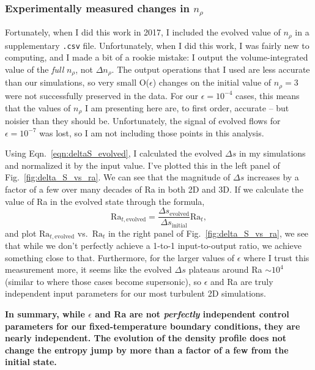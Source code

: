 \subsubsection{Experimentally measured changes in $n_\rho$}
Fortunately, when I did this work in 2017, I included the evolved value of $n_\rho$ in a supplementary \texttt{.csv} file.
Unfortunately, when I did this work, I was fairly new to computing, and I made a bit of a rookie mistake: I output the volume-integrated value of the \emph{full} $n_\rho$, not $\Delta n_\rho$.
The output operations that I used are less accurate than our simulations, so very small O($\epsilon$) changes on the initial value of $n_\rho = 3$ were not successfully preserved in the data.
For our $\epsilon = 10^{-4}$ cases, this means that the values of $n_\rho$ I am presenting here are, to first order, accurate -- but noisier than they should be.
Unfortunately, the signal of evolved flows for $\epsilon = 10^{-7}$ was lost, so I am not including those points in this analysis.

Using Eqn.~\ref{eqn:deltaS_evolved}, I calculated the evolved $\Delta s$ in my simulations and normalized it by the input value.
I've plotted this in the left panel of Fig.~\ref{fig:delta_S_vs_ra}.
We can see that the magnitude of $\Delta s$ increases by a factor of a few over many decades of Ra in both 2D and 3D.
If we calculate the value of Ra in the evolved state through the formula,
$$
\text{Ra}_{t, \text{evolved}} = \frac{\Delta s_{\text{evolved}}}{\Delta s_{\text{initial}}} \text{Ra}_{t},
$$
and plot $\text{Ra}_{t, \text{evolved}}$ vs.~$\text{Ra}_{t}$ in the right panel of Fig.~\ref{fig:delta_S_vs_ra}, we see that while we don't perfectly achieve a 1-to-1 input-to-output ratio, we achieve something close to that.
Furthermore, for the larger values of $\epsilon$ where I trust this measurement more, it seems like the evolved $\Delta s$ plateaus around Ra $\sim 10^4$ (similar to where those cases become supersonic), so $\epsilon$ and Ra are truly independent input parameters for our most turbulent 2D simulations.

\textbf{In summary, while $\epsilon$ and Ra are not \emph{perfectly} independent control parameters for our fixed-temperature boundary conditions, they are nearly independent.
The evolution of the density profile does not change the entropy jump by more than a factor of a few from the initial state.}



